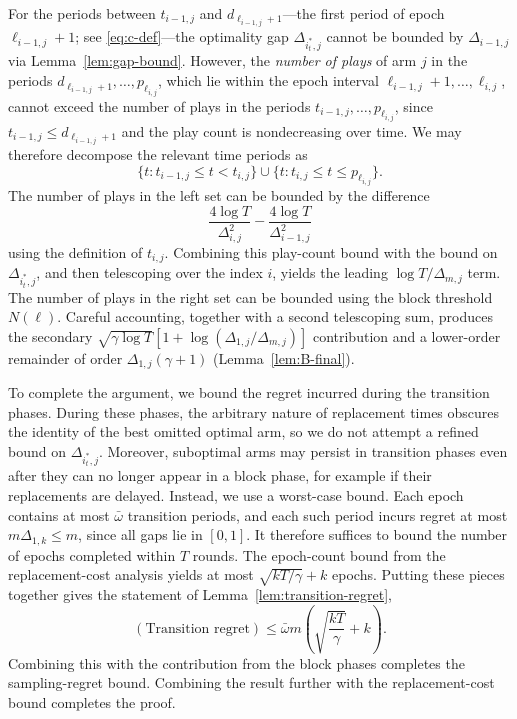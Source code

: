 \documentclass[opre,blindrev]{informs3}
\begin{document}
\begin{APPENDICES}
For the periods between \(t_{i-1,j}\) and \(d_{\ell_{i-1,j}+1}\)---the first period of epoch \(\ell_{i-1,j}+1\); see \eqref{eq:c-def}---the optimality gap \(\Delta_{i_t^*,j}\) cannot be bounded by \(\Delta_{i-1,j}\) via Lemma~\ref{lem:gap-bound}. However, the \emph{number of plays} of arm \(j\) in the periods \(d_{\ell_{i-1,j}+1},\dots, p_{\ell_{i,j}}\), which lie within the epoch interval \(\ell_{i-1,j}+1,\dots, \ell_{i,j}\), cannot exceed the number of plays in the periods \(t_{i-1,j},\dots, p_{\ell_{i,j}}\), since \(t_{i-1,j}\leq d_{\ell_{i-1,j}+1}\) and the play count is nondecreasing over time. We may therefore decompose the relevant time periods as
\[
    \{t:t_{i-1,j}\leq t < t_{i,j}\} \cup  \{t:t_{i,j}\leq t \leq p_{\ell_{i,j}}\}.
\]
The number of plays in the left set can be bounded by the difference
\[
    \frac{4\log T}{\Delta_{i,j}^2} - \frac{4\log T}{\Delta_{i-1,j}^2}
\]
using the definition of \(t_{i,j}\). Combining this play-count bound with the bound on \(\Delta_{i_t^*,j}\), and then telescoping over the index \(i\), yields the leading \(\log T/\Delta_{m,j}\) term. The number of plays in the right set can be bounded using the block threshold \(N(\ell)\). Careful accounting, together with a second telescoping sum, produces the secondary \(\sqrt{\gamma\log T}\left[1+\log(\Delta_{1,j}/\Delta_{m,j})\right]\) contribution and a lower-order remainder of order \(\Delta_{1,j}(\gamma+1)\) (Lemma~\ref{lem:B-final}).

To complete the argument, we bound the regret incurred during the transition phases. During these phases, the arbitrary nature of replacement times obscures the identity of the best omitted optimal arm, so we do not attempt a refined bound on \(\Delta_{i_t^*,j}\). Moreover, suboptimal arms may persist in transition phases even after they can no longer appear in a block phase, for example if their replacements are delayed. Instead, we use a worst-case bound. Each epoch contains at most \(\bar{\omega}\) transition periods, and each such period incurs regret at most \(m\Delta_{1,k} \leq m\), since all gaps lie in \([0,1]\). It therefore suffices to bound the number of epochs completed within \(T\) rounds. The epoch-count bound from the replacement-cost analysis yields at most \(\sqrt{kT/\gamma}+k\) epochs. Putting these pieces together gives the statement of Lemma~\ref{lem:transition-regret},
\[
    (\text{Transition regret})
    \le
    \bar{\omega} m\!\left(\sqrt{\frac{kT}{\gamma}}+k\right).
\]
Combining this with the contribution from the block phases completes the sampling-regret bound. Combining the result further with the replacement-cost bound completes the proof.



\end{APPENDICES}
\end{document}

